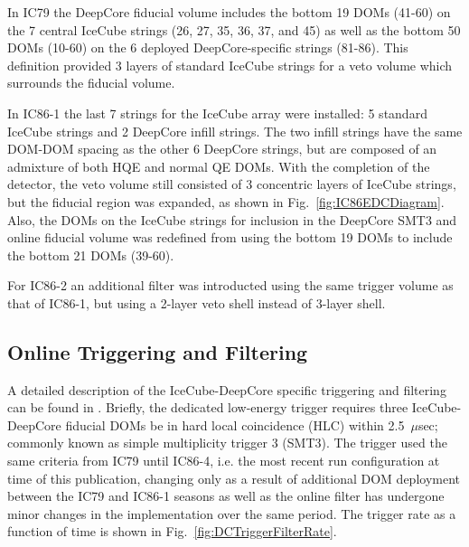 \documentclass[../Main.tex]{subfiles}
\begin{document}
In IC79 the DeepCore fiducial volume includes the bottom 19 DOMs
(41-60) on the 7 central IceCube strings (26, 27, 35, 36, 37,
and 45) as well as the bottom 50 DOMs (10-60) on the 6 deployed DeepCore-specific strings
(81-86). This definition provided 3 layers of standard IceCube strings
for a veto volume which surrounds the fiducial volume. 

In IC86-1 the
last 7 strings for the IceCube array were installed: 5 standard
IceCube strings and 2 DeepCore infill strings. The two infill strings
have the same DOM-DOM spacing as the other 6 DeepCore strings, but are
composed of an admixture of both HQE and normal QE DOMs. With the
completion of the detector, the veto volume still consisted of 3
concentric layers of IceCube strings, but the fiducial region was
expanded, as shown in Fig.~\ref{fig:IC86EDCDiagram}. Also, the DOMs on
the IceCube strings for inclusion in the DeepCore SMT3 and online
fiducial volume was redefined from using the bottom 19 DOMs to include
the bottom 21 DOMs (39-60). 

For IC86-2 an additional
filter was introducted using the same trigger volume as that of
IC86-1, but using a 2-layer veto shell instead of 3-layer shell. 

\subsection{Online Triggering and
  Filtering}\label{sec:OnlineDataCollection}

A detailed description of the IceCube-DeepCore specific
triggering and filtering can be found in
\cite{Collaboration:2011ym}. Briefly, the dedicated low-energy trigger
requires three IceCube-DeepCore fiducial DOMs be in hard local
coincidence (HLC) within 2.5~$\mu$sec; commonly known as simple
multiplicity trigger 3 (SMT3). The trigger used the same criteria from
IC79 until IC86-4, i.e. the most recent run configuration at time of
this publication, changing only as a result of additional DOM deployment between
the IC79 and IC86-1 seasons as well as the online filter has undergone minor changes in the implementation
over the same period. The trigger rate as a function of time is shown
in Fig.~\ref{fig:DCTriggerFilterRate}.
\end{document}
